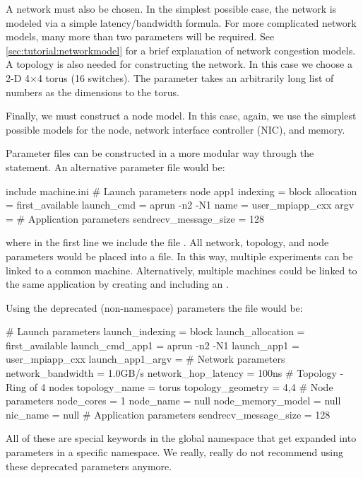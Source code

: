 A network must also be chosen.  
In the simplest possible case, the network is modeled via a simple latency/bandwidth formula.  
For more complicated network models, many more than two parameters will be required. 
See \ref{sec:tutorial:networkmodel} for a brief explanation of \sstmacro network congestion models. 
A topology is also needed for constructing the network.  
In this case we choose a 2-D 4$\times$4 torus (16 switches).  The  
parameter takes an arbitrarily long list of numbers as the dimensions to the torus.

Finally, we must construct a node model.  
In this case, again, we use the simplest possible models for the node, 
network interface controller (NIC), and memory.  

Parameter files can be constructed in a more modular way through the  statement.  
An alternative parameter file would be:

\begin{ViFile}
include machine.ini
# Launch parameters
node {
 app1 {
  indexing = block
  allocation = first_available
  launch_cmd = aprun -n2 -N1
  name = user_mpiapp_cxx
  argv = 
  # Application parameters
  sendrecv_message_size = 128
 }
}

\end{ViFile}
where in the first line we include the file .  
All network, topology, and node parameters would be placed into a  file.  
In this way, multiple experiments can be linked to a common machine.  
Alternatively, multiple machines could be linked to the same application by creating and including an .

Using the deprecated (non-namespace) parameters the file would be:

\begin{ViFile}
# Launch parameters
launch_indexing = block
launch_allocation = first_available
launch_cmd_app1 = aprun -n2 -N1
launch_app1 = user_mpiapp_cxx
launch_app1_argv = 
# Network parameters
network_bandwidth = 1.0GB/s
network_hop_latency = 100ns
# Topology - Ring of 4 nodes
topology_name = torus
topology_geometry = 4,4
# Node parameters
node_cores = 1
node_name = null
node_memory_model = null
nic_name = null
# Application parameters
sendrecv_message_size = 128
\end{ViFile}

All of these are special keywords in the global namespace that get expanded into parameters in a specific namespace. We really, really do not recommend using these deprecated parameters anymore.


